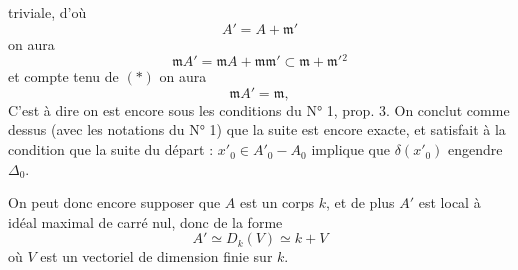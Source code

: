 triviale,  d'où
\[
A'=A+\mathfrak m'
\]
on aura
\[
\mathfrak m A'=\mathfrak m A+\mathfrak m\mathfrak m'\subset\mathfrak m+\mathfrak m'{}^2
\]
et compte tenu de $(*)$ on aura
\[
\mathfrak m A'=\mathfrak m,
\]
C'est à dire on est encore sous les
conditions du N° 1, prop. 3. On conclut
comme dessus (avec les notations du N° 1)
que la suite
est encore exacte, et satisfait à  la
 condition que la suite du départ :
$x'_0\in A'_0-A_0$ implique que $\delta(x'_0)$ engendre  $\Delta_0$.

On peut donc encore supposer que $A$ est un corps
$k$, et de plus $A'$ est local à idéal maximal
de carré nul, donc de la forme
\[
A'\simeq D_k(V)\simeq k+V
\]
où $V$ est un vectoriel de dimension finie sur $k$.
